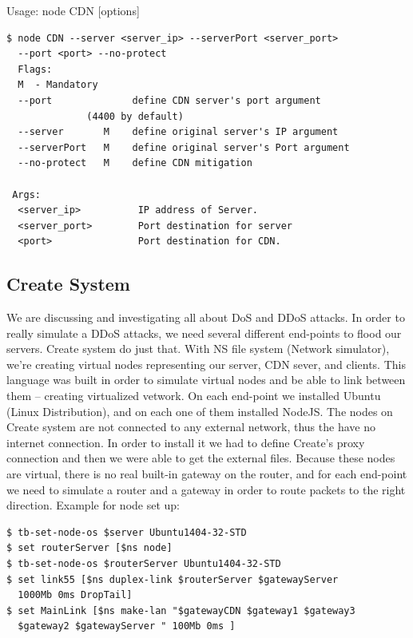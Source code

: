 \documentclass{report}
\begin{document}
\newpage

Usage: node CDN [options]

\begin{lstlisting}[frame=single]
$ node CDN --server <server_ip> --serverPort <server_port> 
  --port <port> --no-protect 
  Flags:
  M  - Mandatory
  --port              define CDN server's port argument 
		      (4400 by default)
  --server       M    define original server's IP argument
  --serverPort   M    define original server's Port argument
  --no-protect   M    define CDN mitigation

 Args:
  <server_ip>          IP address of Server.
  <server_port>        Port destination for server
  <port>               Port destination for CDN.
\end{lstlisting}

\subsection{Create System}
We are discussing and investigating all about \gls{DoS} and \gls{DDoS} attacks. In order to really simulate a \gls{DDoS} attacks, we need several different end-points to flood our servers. Create system do just that.\hfill \break
With NS file system (Network simulator), we’re creating virtual nodes representing our server, \gls{CDN} sever, and clients. This language was built in order to simulate virtual nodes and be able to link between them – creating virtualized vetwork.\hfill \break
On each end-point we installed Ubuntu (Linux Distribution), and on each one of them installed NodeJS. The nodes on Create system are not connected to any external network, thus the have no internet connection. In order to install it we had to define Create’s proxy connection and then we were able to get the external files.\hfill \break
Because these nodes are virtual, there is no real built-in gateway on the router, and for each end-point we need to simulate a router and a gateway in order to route packets to the right direction.\hfill \break
\hfill \break
\noindent  
Example for node set up:
\hfill \break
\begin{lstlisting}[frame=single]
$ tb-set-node-os $server Ubuntu1404-32-STD
$ set routerServer [$ns node]
$ tb-set-node-os $routerServer Ubuntu1404-32-STD
$ set link55 [$ns duplex-link $routerServer $gatewayServer 
  1000Mb 0ms DropTail]
$ set MainLink [$ns make-lan "$gatewayCDN $gateway1 $gateway3
  $gateway2 $gatewayServer " 100Mb 0ms ]
\end{lstlisting}
\end{document}
